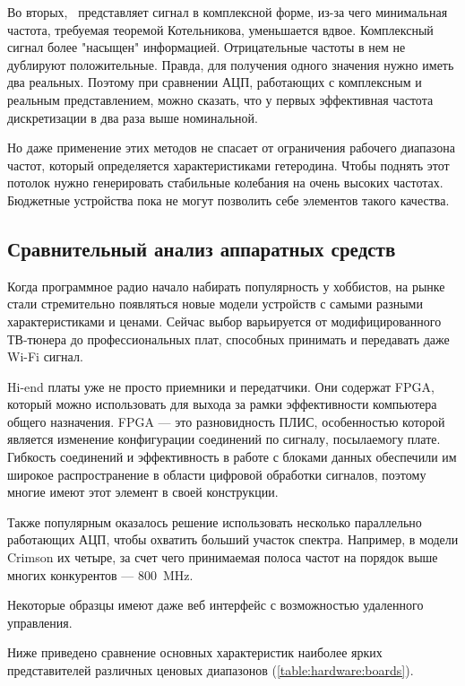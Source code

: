 Во вторых, \SDR\ представляет сигнал в комплексной форме, из-за чего минимальная частота, требуемая теоремой Котельникова, уменьшается вдвое. Комплексный сигнал более "насыщен" информацией. Отрицательные частоты в нем не дублируют положительные. Правда, для получения одного значения нужно иметь два реальных. Поэтому при сравнении АЦП, работающих с комплексным и реальным представлением, можно сказать, что у первых эффективная частота дискретизации в два раза выше номинальной.

Но даже применение этих методов не спасает от ограничения рабочего диапазона частот, который определяется характеристиками гетеродина. Чтобы поднять этот потолок нужно генерировать стабильные колебания на очень высоких частотах. Бюджетные устройства пока не могут позволить себе элементов такого качества.


\subsection{Сравнительный анализ аппаратных средств}

Когда программное радио начало набирать популярность у хоббистов, на рынке стали стремительно появляться новые модели устройств с самыми разными характеристиками и ценами. Сейчас выбор варьируется от модифицированного ТВ-тюнера до профессиональных плат, способных принимать и передавать даже Wi-Fi сигнал.

Hi-end платы уже не просто приемники и передатчики. Они содержат FPGA, который можно использовать для выхода за рамки эффективности компьютера общего назначения. FPGA --- это разновидность ПЛИС, особенностью которой является изменение конфигурации соединений по сигналу, посылаемогу плате. Гибкость соединений и эффективность в работе с блоками данных обеспечили им широкое распространение в области цифровой обработки сигналов, поэтому многие \SDR имеют этот элемент в своей конструкции.

Также популярным оказалось решение использовать несколько параллельно работающих АЦП, чтобы охватить больший участок спектра. Например, в модели Crimson их четыре, за счет чего принимаемая полоса частот на порядок выше многих конкурентов --- \SI{800}{\mega\hertz}.

Некоторые образцы имеют даже веб интерфейс с возможностью удаленного управления.

Ниже приведено сравнение основных характеристик наиболее ярких представителей различных ценовых диапазонов (\autoref{table:hardware:boards}).


